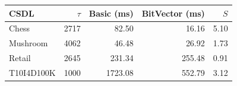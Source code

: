 \begin{tabular}{lrrrr}
\toprule
CSDL & $\tau$ & Basic (ms) & BitVector (ms) & $S$ \\
\midrule
Chess & 2717 & 82.50 & 16.16 & 5.10 \\
Mushroom & 4062 & 46.48 & 26.92 & 1.73 \\
Retail & 2645 & 231.34 & 255.48 & 0.91 \\
T10I4D100K & 1000 & 1723.08 & 552.79 & 3.12 \\
\bottomrule
\end{tabular}
